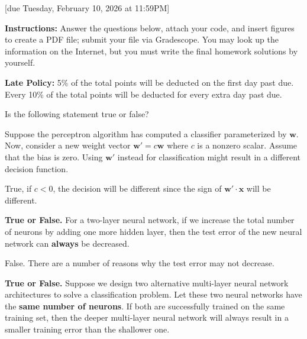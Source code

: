 \documentclass{article}
\newcommand{\x}{\mathbf{x}}
\newcommand{\w}{\mathbf{w}}
\begin{document}
[due Tuesday, February 10, 2026 at 11:59PM]

\textbf{Instructions:} Answer the questions below, attach your code, and insert figures to create a PDF file; submit your file via Gradescope. You may look up the information on the Internet, but you must write the final homework solutions by yourself.

\textbf{Late Policy:} 5\% of the total points will be deducted on the first day past due. Every 10\% of the total points will be deducted for every extra day past due.


\begin{probset}
\begin{prob}
    \begin{subprobset}
        \begin{subprob}
            Is the following statement true or false?

            Suppose the perceptron algorithm has computed a classifier parameterized by $\w$. Now, consider a new weight vector $\w' = c\w$ where $c$ is a nonzero scalar. Assume that the bias is zero. Using $\w'$ instead for classification might result in a different decision function.

            \begin{soln}
                True, if $c < 0$, the decision will be different since the sign of $\w' \cdot \x$ will be different.
            \end{soln}
        \end{subprob}

        \begin{subprob}
            \textbf{True or False.} For a two-layer neural network, if we increase the total number of neurons by adding one more hidden layer, then the test error of the new neural network can \textbf{always} be decreased.

            \begin{soln}
                False. There are a number of reasons why the test error may not decrease.
            \end{soln}
        \end{subprob}

        \begin{subprob}
            \textbf{True or False.} Suppose we design two alternative multi-layer neural network architectures to solve a classification problem. Let these two neural networks have the \textbf{same number of neurons}. If both are successfully trained on the same training set, then the deeper multi-layer neural network will always result in a smaller training error than the shallower one.


\end{subprob}
\end{subprobset}
\end{prob}
\end{probset}
\end{document}
